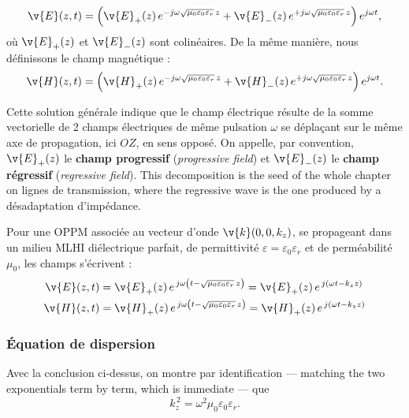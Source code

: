 \begin{prop}
  \[
    \v{E}(z,t) = \Big(
      \v{E}_+(z)\,e^{-j\omega\sqrt{\mu_0\varepsilon_0\varepsilon_r}\,z}
      + \v{E}_-(z)\,e^{+j\omega\sqrt{\mu_0\varepsilon_0\varepsilon_r}\,z}
    \Big)\,e^{j\omega t},
  \]
  où $\v{E}_+(z)$ et $\v{E}_-(z)$ sont colinéaires. De la même manière, nous
  définissons le champ magnétique :
  \[
    \v{H}(z,t) = \Big(
      \v{H}_+(z)\,e^{-j\omega\sqrt{\mu_0\varepsilon_0\varepsilon_r}\,z}
      + \v{H}_-(z)\,e^{+j\omega\sqrt{\mu_0\varepsilon_0\varepsilon_r}\,z}
    \Big)\,e^{j\omega t}.
  \]
\end{prop}

Cette solution générale indique que le champ électrique résulte de la somme
vectorielle de 2 champs électriques de même pulsation $\omega$ se déplaçant sur
le même axe de propagation, ici $OZ$, en sens opposé. On appelle, par
convention, $\v{E}_+(z)$ le \textbf{champ progressif} (\textit{progressive
field}) et $\v{E}_-(z)$ le \textbf{champ régressif} (\textit{regressive
field}). This decomposition is the seed of the whole chapter on lignes de
transmission, where the regressive wave is the one produced by a désadaptation
d'impédance.

\begin{conclusion}
  Pour une OPPM associée au vecteur d'onde $\v{k}(0,0,k_z)$, se propageant dans
  un milieu MLHI diélectrique parfait, de permittivité
  $\varepsilon = \varepsilon_0\varepsilon_r$ et de perméabilité $\mu_0$, les
  champs s'écrivent :
  \[
    \begin{aligned}
      \v{E}(z,t) &= \v{E}_+(z)\,e^{\,j\omega\left(t - \sqrt{\mu_0\varepsilon_0\varepsilon_r}\,z\right)}
                  = \v{E}_+(z)\,e^{\,j(\omega t - k_z z)} \\
      \v{H}(z,t) &= \v{H}_+(z)\,e^{\,j\omega\left(t - \sqrt{\mu_0\varepsilon_0\varepsilon_r}\,z\right)}
                  = \v{H}_+(z)\,e^{\,j(\omega t - k_z z)}
    \end{aligned}
  \]
\end{conclusion}

\subsubsection{Équation de dispersion}

Avec la conclusion ci-dessus, on montre par identification --- matching the two
exponentials term by term, which is immediate --- que
\[
  k_z^{\,2} = \omega^2\mu_0\varepsilon_0\varepsilon_r.
\]

